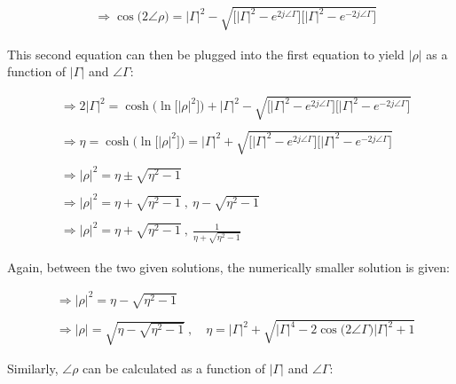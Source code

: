 \documentclass{article}
\begin{document}
\begin{align*}
    & \Rightarrow \cos\big(2\angle{\rho}\big) = \big|\Gamma\big|^{2} - \sqrt{\bigg[\big|\Gamma\big|^{2} - e^{2j\angle{\Gamma}}\bigg]\bigg[\big|\Gamma\big|^{2} - e^{-2j\angle{\Gamma}}\bigg]}
  \end{align*}\newline

This second equation can then be plugged into the first equation to yield $\big|\rho\big|$ as a function of $\big|\Gamma\big|$ and $\angle{\Gamma}$:

\begin{align*}
    & \Rightarrow 2\big|\Gamma\big|^{2} = \cosh\Big(\ln\big[\big|\rho\big|^{2}\big]\Big) + \big|\Gamma\big|^{2} - \sqrt{\bigg[\big|\Gamma\big|^{2} - e^{2j\angle{\Gamma}}\bigg]\bigg[\big|\Gamma\big|^{2} - e^{-2j\angle{\Gamma}}\bigg]} \\ \\
    & \Rightarrow \eta = \cosh\Big(\ln\big[\big|\rho\big|^{2}\big]\Big) = \big|\Gamma\big|^{2} + \sqrt{\bigg[\big|\Gamma\big|^{2} - e^{2j\angle{\Gamma}}\bigg]\bigg[\big|\Gamma\big|^{2} - e^{-2j\angle{\Gamma}}\bigg]} \\ \\
    & \Rightarrow \big|\rho\big|^{2} = \eta \pm \sqrt{\eta^{2} - 1} \\ \\
    & \Rightarrow \big|\rho\big|^{2} = \eta + \sqrt{\eta^{2} - 1} \ , \ \eta - \sqrt{\eta^{2} - 1} \\ \\
    & \Rightarrow \big|\rho\big|^{2} = \eta + \sqrt{\eta^{2} - 1} \ , \ \frac{1}{\eta + \sqrt{\eta^{2} - 1}}
  \end{align*}

Again, between the two given solutions, the numerically smaller solution is given:

\begin{align*}
    & \Rightarrow \big|\rho\big|^{2} = \eta - \sqrt{\eta^{2} - 1} \\ \\
    & \Rightarrow \big|\rho\big| = \sqrt{\eta - \sqrt{\eta^{2} - 1}} \ , \quad \eta = \big|\Gamma\big|^{2} + \sqrt{\big|\Gamma\big|^{4} - 2\cos\big(2\angle{\Gamma}\big)|\Gamma|^{2} + 1}
  \end{align*}\newline

\newpage

Similarly, $\angle{\rho}$ can be calculated as a function of $\big|\Gamma\big|$ and $\angle{\Gamma}$:
\end{document}
